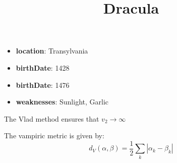 \documentclass[10pt, letterpaper]{article}
\title{Dracula}
\begin{document}
	
	\maketitle
	
	\begin{itemize}
		\item \textbf{location}: Transylvania
		\item \textbf{birthDate}: 1428
		\item \textbf{birthDate}: 1476
		\item \textbf{weaknesses}: Sunlight, Garlic
	\end{itemize}

	The Vlad method ensures that $v_2 \rightarrow \infty$
	
	The vampiric metric is given by:
	$$	d_{V}(\alpha, \beta) = \frac{1}{2} \sum_{k} |\alpha_k - \beta_k | $$

	
 
\end{document}
